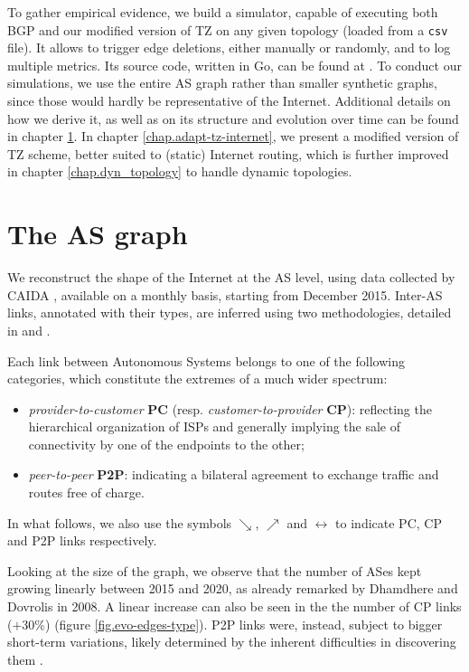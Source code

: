 \documentclass[a4paper,11pt,oneside]{report}
\begin{document}
To gather empirical evidence, we build a simulator, capable of executing both BGP and our modified version of TZ on any given topology (loaded from a \texttt{csv} file). It allows to trigger edge deletions, either manually or randomly, and to log multiple metrics. Its source code, written in Go, can be found at \cite{RoutingAlgorithmsSimulator}. To conduct our simulations, we use the entire AS graph rather than smaller synthetic graphs, since those would hardly be representative of the Internet. Additional details on how we derive it, as well as on its structure and evolution over time can be found in chapter \ref{chap.as-graph}.
In chapter \ref{chap.adapt-tz-internet}, we present a modified version of TZ scheme, better suited to (static) Internet routing, which is further improved in chapter \ref{chap.dyn_topology} to handle dynamic topologies.

\chapter{The AS graph}
\label{chap.as-graph}

We reconstruct the shape of the Internet at the AS level, using data collected by CAIDA \cite{GraphCAIDA}, available on a monthly basis, starting from December 2015. Inter-AS links, annotated with their types, are inferred using two methodologies, detailed in \cite{luckieRelationshipsCustomerCones2013} and \cite{giotsasInferringMultilateralPeering2013}.

\bigskip
Each link between Autonomous Systems belongs to one of the following categories, which constitute the extremes of a much wider spectrum:
\begin{itemize}
\item \emph{provider-to-customer} \textbf{PC} (resp. \emph{customer-to-provider} \textbf{CP}): reflecting the hierarchical organization of ISPs and generally implying the sale of connectivity by one of the endpoints to the other;
\item \emph{peer-to-peer} \textbf{P2P}: indicating a bilateral agreement to exchange traffic and routes free of charge.
\end{itemize}
In what follows, we also use the symbols $\searrow$, $\nearrow$ and $\longleftrightarrow$ to indicate PC, CP and P2P links respectively.

\bigskip
Looking at the size of the graph, we observe that the number of ASes kept growing linearly between 2015 and 2020, as already remarked by Dhamdhere and Dovrolis \cite{dhamdhereTenYearsEvolution2008} in 2008. A linear increase can also be seen in the the number of CP links ($+30\%$) (figure \ref{fig.evo-edges-type}). P2P links were, instead, subject to bigger short-term variations, likely determined by the inherent difficulties in discovering them \cite{dhamdhereTenYearsEvolution2008}.
\end{document}
